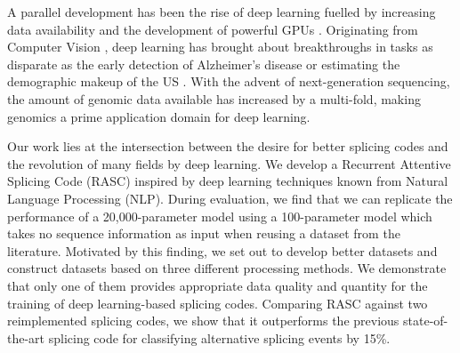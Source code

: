


A parallel development has been the rise of deep learning fuelled by increasing data availability and the development of powerful GPUs \cite{deeplearning}. 
Originating from Computer Vision \cite{alexnet}, deep learning has brought about breakthroughs in tasks as disparate as the early detection of Alzheimer's disease \cite{alzheimerdeeplearning} or estimating the demographic makeup of the US \cite{demographic}. 
With the advent of next-generation sequencing, the amount of genomic data available has increased by a multi-fold, making genomics a prime application domain for deep learning. 



Our work lies at the intersection between the desire for better splicing codes and the revolution of many fields by deep learning. We develop a Recurrent Attentive Splicing Code (RASC) inspired by deep learning techniques known from Natural Language Processing (NLP). During evaluation, we find that we can replicate the performance of a 20,000-parameter model using a 100-parameter model which takes no sequence information as input when reusing a dataset from the literature. Motivated by this finding, we set out to develop better datasets and construct datasets based on three different processing methods. We demonstrate that only one of them provides appropriate data quality and quantity for the training of deep learning-based splicing codes. Comparing RASC against two reimplemented splicing codes, we show that it outperforms the previous state-of-the-art splicing code for classifying alternative splicing events by 15\%. 




